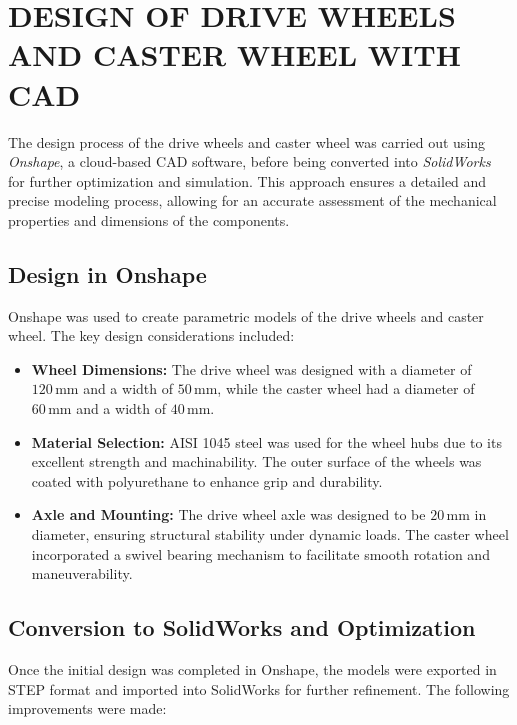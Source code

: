 \documentclass[../../main]{subfiles}
\begin{document}
\section{DESIGN OF DRIVE WHEELS AND CASTER WHEEL  WITH  CAD}
The design process of the drive wheels and caster wheel was carried out using \emph{Onshape}, a cloud-based CAD software, before being converted into \emph{SolidWorks} for further optimization and simulation. This approach ensures a detailed and precise modeling process, allowing for an accurate assessment of the mechanical properties and dimensions of the components.

\subsection{Design in Onshape}
Onshape was used to create parametric models of the drive wheels and caster wheel. The key design considerations included:
\begin{itemize}

\item \textbf{Wheel Dimensions:} The drive wheel was designed with a diameter of $120 \, \mathrm{mm}$ and a width of $50 \, \mathrm{mm}$, while the caster wheel had a diameter of $60 \, \mathrm{mm}$ and a width of $40 \, \mathrm{mm}$.
  
\item \textbf{Material Selection:} AISI 1045 steel was used for the wheel hubs due to its excellent strength and machinability. The outer surface of the wheels was coated with polyurethane to enhance grip and durability.
  
\item \textbf{Axle and Mounting:} The drive wheel axle was designed to be $20 \, \mathrm{mm}$ in diameter, ensuring structural stability under dynamic loads. The caster wheel incorporated a swivel bearing mechanism to facilitate smooth rotation and maneuverability.
  
\end{itemize}

\subsection{Conversion to SolidWorks and Optimization}
Once the initial design was completed in Onshape, the models were exported in STEP format and imported into SolidWorks for further refinement. The following improvements were made:
\end{document}
